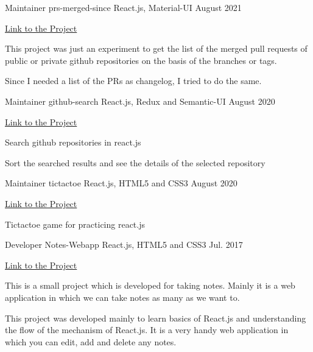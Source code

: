 \begin{cventries}
  \cventry
    {Maintainer }
    {prs-merged-since}
    {React.js, Material-UI}
    {August 2021}
    {
      \begin{cvitems}
      \item{\href{https://github.com/lalitmee/prs-merged-since}{Link to the Project}}
        \item {This project was just an experiment to get the list of the merged pull requests of public or private github repositories on the basis of the branches or tags.}
        \item{Since I needed a list of the PRs as changelog, I tried to do the same.}
      \end{cvitems}
     }
\end{cventries}
\begin{cventries}
  \cventry
    {Maintainer }
    {github-search}
    {React.js, Redux and Semantic-UI}
    {August 2020}
    {
      \begin{cvitems}
      \item{\href{https://github.com/lalitmee/github-search}{Link to the Project}}
        \item {Search github repositories in react.js}
        \item {Sort the searched results and see the details of the selected repository}
      \end{cvitems}
     }
\end{cventries}
\begin{cventries}
  \cventry
    {Maintainer }
    {tictactoe}
    {React.js, HTML5 and CSS3}
    {August 2020}
    {
      \begin{cvitems}
      \item{\href{https://github.com/lalitmee/tictactoe}{Link to the Project}}
        \item {Tictactoe game for practicing react.js}
      \end{cvitems}
     }
\end{cventries}
\begin{cventries}
  \cventry
    {Developer }
    {Notes-Webapp}
    {React.js, HTML5 and CSS3}
    {Jul. 2017}
    {
      \begin{cvitems}
      \item{\href{https://lalitmee.github.io/Notes-App/}{Link to the Project}}
        \item {This is a small project which is developed for taking notes. Mainly it is a web application in which we can take notes as many as we want to. }
        \item{This project was developed mainly to learn basics of React.js and understanding the flow of the mechanism of React.js. It is a very handy web application in which you can edit, add and delete any notes.}
      \end{cvitems}
     }
\end{cventries}
